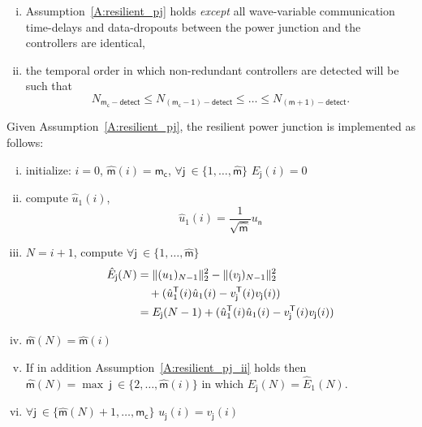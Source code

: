 \begin{assumption}
\label{A:resilient_pj_ii}
\begin{enumerate}[i)]
\item Assumption~\ref{A:resilient_pj} holds {\em except} all
  wave-variable communication time-delays and data-dropouts between
  the power junction and the controllers are identical,
\item the temporal order in which non-redundant controllers are detected
  will be such that
\begin{equation*}
N_{\mathsf{m_c-detect}} \leq N_{\mathsf{(m_c-1)-detect}} \leq \dots
\leq N_{\mathsf{(m+1)-detect}}.
\end{equation*}
\end{enumerate}
\end{assumption}
\begin{definition}
\label{D:resilient_pj}
Given Assumption~\ref{A:resilient_pj}, the resilient power junction is
implemented as follows:
\begin{enumerate}[i)]
\item initialize: $i=0$, $\hat{\mathsf{m}}(i)=\mathsf{m_c}$, $\forall
  \mathsf{j}\ \in \{1,\dots,\hat{\mathsf{m}}\}$ $E_{\mathsf{j}}(i)=0$
\item \label{res_pj_loop_start} compute $\hat{u}_{1}(i)$,
\begin{equation}
\label{E:uj_apj}
\hat{u}_{1}(i) = \frac{1}{\sqrt{\hat{\mathsf{m}}}} u_{\mathsf{n}}
\end{equation}
\item $N=i+1$, compute $\forall \mathsf{j}\ \in \{1,\dots,\hat{\mathsf{m}}\}$
\begin{align*}
\hat{E}_{\mathsf{j}}(N) &= \|(u_1)_{N-1}\|_{2}^2 -
\|(v_{\mathsf{j}})_{N-1}\|_{2}^2 \\
&\quad + (\hat{u}_1 ^{\mathsf{T}}(i) \hat{u}_1(i) -v_{\mathsf{j}}^{\mathsf{T}}(i) v_{\mathsf{j}}(i))\\
&= E_{\mathsf{j}}(N-1) + (\hat{u}_1^{\mathsf{T}}(i) \hat{u}_1(i) - v_{\mathsf{j}}^{\mathsf{T}}(i) v_{\mathsf{j}}(i))
\end{align*}
\item $\hat{\mathsf{m}}(N)=\hat{\mathsf{m}}(i)$
\item If in addition Assumption~\ref{A:resilient_pj_ii} holds then
  $\hat{\mathsf{m}}(N)=\max\ \mathsf{j}\ \in \{2,\dots,\hat{\mathsf{m}}(i)\}$ in
  which $\hat{E}_{\mathsf{j}}(N) = \hat{E}_{1}(N)$.
\item $\forall \mathsf{j}\ \in \{\hat{\mathsf{m}}(N) +
  1,\dots,\mathsf{m_c}\}$ $u_{\mathsf{j}}(i)=v_{\mathsf{j}}(i)$

\end{enumerate}
\end{definition}
